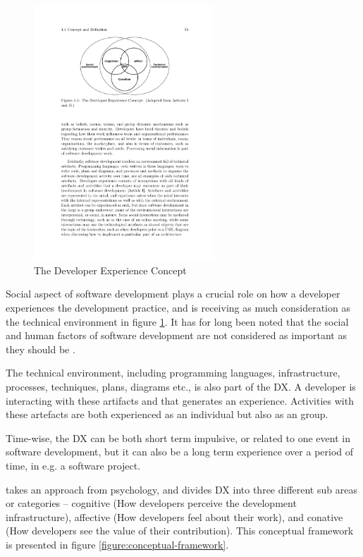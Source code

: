 \documentclass[english, 12pt, a4paper, sci, utf8, a-1b, online]{aaltothesis}
\begin{document}
\begin{figure}
  \captionsetup{width=0.6\textwidth}
  \caption{The Developer Experience Concept \parencite{fagerholm-doctoral-thesis}}
  \begin{center}
    \includegraphics[width=0.6\textwidth]{dx-social-technical.pdf}
  \end{center}
  \label{figure:social-technical}
\end{figure}



Social aspect of software development plays a crucial role on how a developer experiences the development practice, and is receiving as much consideration as the technical environment in figure \ref{figure:social-technical}. It has for long been noted that the social and human factors of software development are not considered as important as they should be \parencite{human-factor}.

The technical environment, including programming languages, infrastructure, processes, techniques, plans, diagrams etc., is also part of the DX. A developer is interacting with these artifacts and that generates an experience. Activities with these artefacts are both experienced as an individual but also as an group.

Time-wise, the DX can be both short term impulsive, or related to one event in software development, but it can also be a long term experience over a period of time, in e.g. a software project.

\textcite{fagerholm-dx-concept-and-definition} takes an approach from psychology, and divides DX into three different sub areas or categories – cognitive (How developers perceive the development infrastructure), affective (How developers feel about their work), and conative (How developers see the value of their contribution). This conceptual framework is presented in figure \ref{figure:conceptual-framework}.
\end{document}
